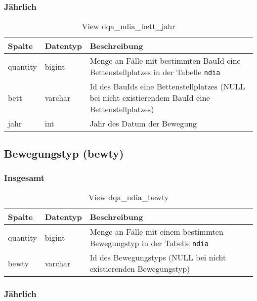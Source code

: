 \subsubsection{Jährlich} \label{subsubsec:bettJ}

\begin{table}[ht]
	\centering   
	\caption{View dqa\_ndia\_bett\_jahr}
	\label{tab:beweBettJahr}
	\begin{tabular}{||l|l|p{10cm}||}   		
		\hline
		Spalte & Datentyp & Beschreibung \\ [0.5ex]
		\hline\hline
		quantity & bigint & Menge an Fälle mit bestimmten BauId eine Bettenstellplatzes in der Tabelle \texttt{ndia} \\
		\hline
		bett & varchar &  Id des BauIds eine Bettenstellplatzes (NULL bei nicht existierendem BauId eine Bettenstellplatzes) \\
		\hline
		jahr & int &  Jahr des Datum der Bewegung \\
		\hline		
	\end{tabular}
\end{table}

\subsection{Bewegungstyp (bewty)} \label{subsec:bewtyp}

\subsubsection{Insgesamt} \label{subsubsec:bewtypI}

\begin{table}[ht]
	\centering   
	\caption{View dqa\_ndia\_bewty}
	\label{tab:bewBtyI}
	\begin{tabular}{||l|l|p{10cm}||}   		
		\hline
		Spalte & Datentyp & Beschreibung \\ [0.5ex]
		\hline\hline
		quantity & bigint & Menge an Fälle mit einem bestimmten Bewegungstyp in der Tabelle \texttt{ndia} \\
		\hline
		bewty & varchar & Id des Bewegungstyps (NULL bei nicht existierenden Bewegungstyp)\\
		\hline
		
	\end{tabular}
\end{table}

\newpage

\subsubsection{Jährlich} \label{subsubsec:bewtypJ}

